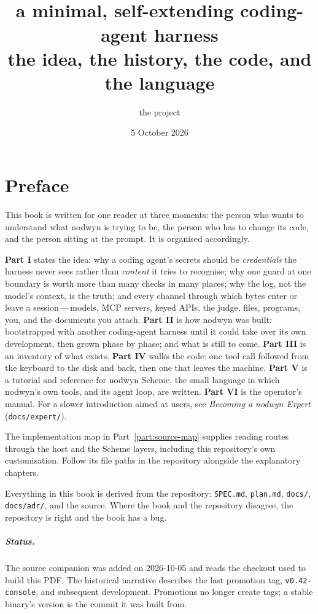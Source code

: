 \documentclass[11pt,a4paper,oneside]{book}
\title{\Huge\textbf{\nodwyn}\\[0.6em]\Large a minimal, self-extending coding-agent harness\\[0.4em]\large the idea, the history, the code, and the language}
\author{the \nodwyn{} project}
\date{5 October 2026}
\newcommand{\nodwyn}{\textsf{nodwyn}}
\newcommand{\code}[1]{\texttt{#1}}
\newcommand{\file}[1]{\texttt{#1}}
\begin{document}
\frontmatter
\maketitle

\chapter*{Preface}

This book is written for one reader at three moments: the person who wants
to understand what \nodwyn{} is trying to be, the person who has to change its
code, and the person sitting at the prompt. It is organised accordingly.

\textbf{Part I} states the idea: why a coding agent's secrets should be
\emph{credentials} the harness never sees rather than \emph{content} it tries
to recognise; why one guard at one boundary is worth more than many checks
in many places; why the log, not the model's context, is the truth; and
every channel through which bytes enter or leave a session\,---\,models, MCP
servers, keyed APIs, the judge, files, programs, you, and the documents you
attach. \textbf{Part II} is how \nodwyn{} was built: bootstrapped with
another coding-agent harness until it could take over its own development,
then grown phase by phase; and what is still to come. \textbf{Part III} is
an inventory of what exists. \textbf{Part IV} walks the code: one tool call
followed from the keyboard to the disk and back, then one that leaves the
machine. \textbf{Part V} is a tutorial and reference for \nodwyn{} Scheme,
the small language in which \nodwyn's own tools, and its agent loop, are
written. \textbf{Part VI} is the operator's manual. For a slower
introduction aimed at users, see \emph{Becoming a \nodwyn{} Expert}
(\file{docs/expert/}).

The implementation map in Part~\ref{part:source-map} supplies reading
routes through the host and the Scheme layers, including this repository's
own customisation. Follow its file paths in the repository alongside the
explanatory chapters.

Everything in this book is derived from the repository: \file{SPEC.md},
\file{plan.md}, \file{docs/}, \file{docs/adr/}, and the source. Where the
book and the repository disagree, the repository is right and the book has
a bug.

\paragraph{Status.} The source companion was added on 2026-10-05 and reads
the checkout used to build this PDF. The historical narrative describes
the last promotion tag, \code{v0.42-console}, and subsequent development.
Promotions no longer create tags; a stable binary's version is the commit
it was built from.

\tableofcontents

\mainmatter







\appendix

\end{document}
